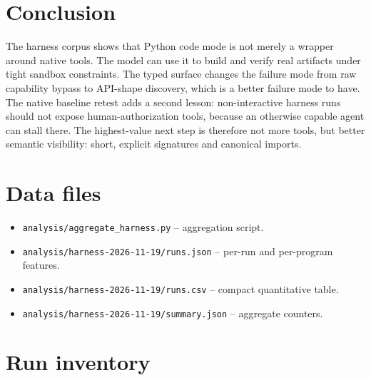 \documentclass[11pt]{article}
\newcommand{\code}[1]{\texttt{#1}}
\begin{document}
\section{Conclusion}

The harness corpus shows that Python code mode is not merely a wrapper around
native tools.  The model can use it to build and verify real artifacts under
tight sandbox constraints.  The typed surface changes the failure mode from raw
capability bypass to API-shape discovery, which is a better failure mode to
have.  The native baseline retest adds a second lesson: non-interactive harness
runs should not expose human-authorization tools, because an otherwise capable
agent can stall there.  The highest-value next step is therefore not more
tools, but better semantic visibility: short, explicit signatures and canonical
imports.

\appendix

\section{Data files}

\begin{itemize}[leftmargin=1.5em]
\item \code{analysis/aggregate\_harness.py} -- aggregation script.
\item \code{analysis/harness-2026-11-19/runs.json} -- per-run and per-program features.
\item \code{analysis/harness-2026-11-19/runs.csv} -- compact quantitative table.
\item \code{analysis/harness-2026-11-19/summary.json} -- aggregate counters.
\end{itemize}

\section{Run inventory}
\end{document}
